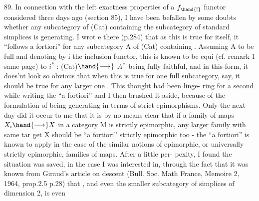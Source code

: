 89. In connection with the left exactness properties of a $f_{\hand{!}}$ functor\hand{,}
considered three days ago (section 85), I have been befallen by some
doubts whether any subcategory of (Cat) containing the subcategory
of standard simplices is  generating. I wrot e there (p.284) that as
this is true for \hand{$\Delta$} itself, it ``follows a fortiori'' for any subcategory
A of (Cat) containing \hand{$\Delta$}. Assuming A to be full and denoting by i the
inclusion functor, this is known to be equi (cf. remark 1 same page)
to $i^{*}$ : (Cat)$\hand{\longrightarrow}$ $A^{\wedge}$ being fully faithful, and in this form, it does'nt
look so obvious that when this is true for one full subcategory,  say,
it should be true for any larger one . This thought had  been linge-%
ring for a second while writing the ``a fortiori'' and I then brushed it
aside, because of the formulation of being generating in terms of strict
epimorphisms. Only the next day did it occur to me that it is by no
means clear that if a family of maps $X_i \hand{\longrightarrow} X$ in a category M is
strictly epimorphic, any larger family with same tar get X should be ``a
fortiori'' strictly epimorphic too - the ``a fortiori'' is known to apply
 in the case of  the similar notions of epimorphic, or
universally strictly epimorphic, families of maps. After a little per-%
pexity, I found the situation was saved, in the case I was interested
in, through the fact that it was known from Giraud's article on descent
(Bull. Soc. Math France, Memoire 2, 1964, prop.2.5 p.28) that \hand{$\Delta$},
and even the smaller subcategory of simplices of dimension \hand{$\leqslant$} 2, is even

